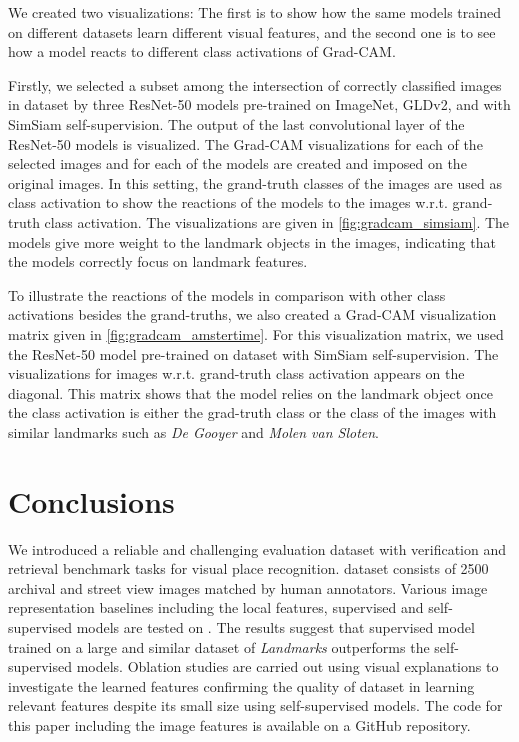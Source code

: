 \documentclass[a4paper,conference]{IEEEtran}
\begin{document}
We created two visualizations: The first is to show how the same models trained on different datasets learn different visual features, and the second one is to see how a model reacts to different class activations of Grad-CAM.

Firstly, we selected a subset among the intersection of correctly classified images in \amsterdam dataset by three ResNet-50 models pre-trained on ImageNet, GLDv2, and \amstertime with SimSiam self-supervision. The output of the last convolutional layer of the ResNet-50 models is visualized. The Grad-CAM visualizations for each of the selected images and for each of the models are created and imposed on the original images. In this setting, the grand-truth classes of the images are used as class activation to show the reactions of the models to the images w.r.t. grand-truth class activation. The visualizations are given in \cref{fig:gradcam_simsiam}. The models give more weight to the landmark objects in the images, indicating that the models correctly focus on landmark features.

To illustrate the reactions of the models in comparison with other class activations besides the grand-truths, we also created a Grad-CAM visualization matrix given in \cref{fig:gradcam_amstertime}. For this visualization matrix, we used the ResNet-50 model pre-trained on \amstertime dataset with SimSiam self-supervision. The visualizations for images w.r.t. grand-truth class activation appears on the diagonal. This matrix shows that the model relies on the landmark object once the class activation is either the grad-truth class or the class of the images with similar landmarks such as \textit{De Gooyer} and \textit{Molen van Sloten}. \section{Conclusions}
We introduced \amstertime a reliable and challenging evaluation dataset with verification and retrieval benchmark tasks for visual place recognition. \amstertime dataset consists of  2500 archival and street view images matched by human annotators. Various image representation baselines including the local features, supervised and self-supervised models are tested on \amstertime. The results suggest that supervised model trained on a large and similar dataset of {\textit{Landmarks}} outperforms the self-supervised models.  Oblation studies are carried out using visual explanations to investigate the learned features confirming the quality of \amstertime dataset in learning relevant features despite its small size using self-supervised models. The code for this paper including the image features is available on a GitHub repository.  
\end{document}
